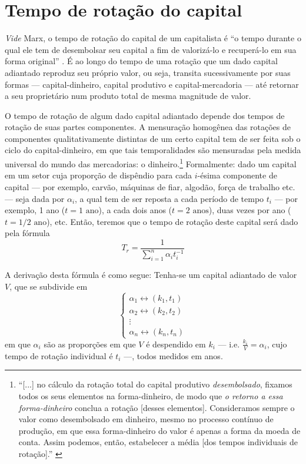 \section{Tempo de rotação do capital}
\textit{Vide} Marx, o tempo de rotação do capital de um capitalista é ``o tempo durante o qual ele tem de desembolsar seu capital a fim de valorizá-lo e recuperá-lo em sua forma original'' \parencite[p. 238]{Marx2014}. É ao longo do tempo de uma rotação que um dado capital adiantado reproduz seu próprio valor, ou seja, transita sucessivamente por suas formas --- capital-dinheiro, capital produtivo e capital-mercadoria --- até retornar a seu proprietário num produto total de mesma magnitude de valor. 

O tempo de rotação de algum dado capital adiantado depende dos tempos de rotação de suas partes componentes. A mensuração homogênea das rotações de componentes qualitativamente distintas de um certo capital tem de ser feita sob o ciclo do capital-dinheiro, em que tais temporalidades são mensuradas pela medida universal do mundo das mercadorias: o dinheiro.\footnote{``[...] no cálculo da rotação total do capital produtivo \textit{desembolsado}, fixamos todos os seus elementos na forma-dinheiro, de modo que \textit{o retorno a essa forma-dinheiro} conclua a rotação [desses elementos]. Consideramos sempre o valor como desembolsado em dinheiro, mesmo no processo contínuo de produção, em que essa forma-dinheiro do valor é apenas a forma da moeda de conta. Assim podemos, então, estabelecer a média [dos tempos individuais de rotação].'' \parencite[p. 268, grifo meu]{Marx2014}} Formalmente: dado um capital em um setor cuja proporção de dispêndio para cada $i$-ésima componente de capital --- por exemplo, carvão, máquinas de fiar, algodão, força de trabalho etc. --- seja dada por $\alpha_{i}$, a qual tem de ser reposta a cada período de tempo $t_{i}$ --- por exemplo, 1 ano ($t=1\text{ ano}$), a cada dois anos ($t=2\text{ anos}$), duas vezes por ano ($t=1/2\text{ ano}$), etc. Então, teremos que o tempo de rotação deste capital será dado pela fórmula
$$
T_r= \frac{1}{\sum \limits_{i=1}^{n} \alpha_{i} t_{i}^{-1}}
$$

A derivação desta fórmula é como segue: Tenha-se um capital adiantado de valor $V$, que se subdivide em
$$
\begin{cases}
\alpha_{1} \leftrightarrow  (k_{1}, t_{1}) \\
\alpha_{2} \leftrightarrow  (k_{2}, t_{2}) \\
\vdots \\
\alpha_{n} \leftrightarrow  (k_{n}, t_{n})
\end{cases}
$$
em que $\alpha_{i}$ são as proporções em que $V$ é despendido em $k_{i}$ --- i.e. $\frac{k_{i}}{V} = \alpha_{i}$, cujo tempo de rotação individual é $t_{i}$ ---, todos medidos em anos.


